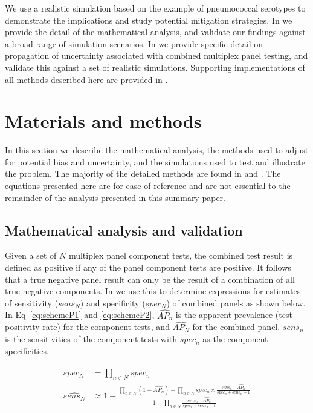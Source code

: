 \documentclass[10pt,letterpaper]{article}
\begin{document}
We use a realistic simulation based on the example of pneumococcal serotypes to demonstrate the implications and study potential mitigation strategies. In  we provide the detail of the mathematical analysis, and validate our findings against a broad range of simulation scenarios. In  we provide specific detail on propagation of uncertainty associated with combined multiplex panel testing, and validate this against a set of realistic simulations. Supporting implementations of all methods described here are provided in .

\section*{Materials and methods}

In this section we describe the mathematical analysis, the methods used to adjust for potential bias and uncertainty, and the simulations used to test and illustrate the problem. The majority of the detailed methods are found in  and . The equations presented here are for ease of reference and are not essential to the remainder of the analysis presented in this summary paper.

\subsection*{Mathematical analysis and validation}

Given a set of \(N\) multiplex panel component tests, the combined test result is defined as positive if any of the panel component tests are positive. It follows that a true negative panel result can only be the result of a combination of all true negative components. In  we use this to determine expressions for estimates of sensitivity (\(sens_N\)) and specificity (\(spec_N\)) of combined panels as shown below. In Eq~\ref{eq:schemeP1} and \ref{eq:schemeP2}, \(\widehat{AP_n}\) is the apparent prevalence (test positivity rate) for the component tests, and \(\widehat{AP_N}\) for the combined panel. \(sens_n\) is the sensitivities of the component tests with \(spec_n\) as the component specificities.

\begin{eqnarray}
\label{eq:schemeP1}
\begin{aligned}
spec_N &= \prod_{n \in N}{spec_n} \\
\widehat{sens_N} &\approx 1-\frac{
  \prod_{n \in N}{(1-\widehat{AP_n})} - \prod_{n \in N}{spec_n \times \frac{sens_n-\widehat{AP_n}}{spec_n + sens_n - 1}}
}{
  1 - \prod_{n \in N}{ \frac{sens_n-\widehat{AP_n}}{spec_n + sens_n - 1} }
} \\
\end{aligned}
\end{eqnarray}
\end{document}
